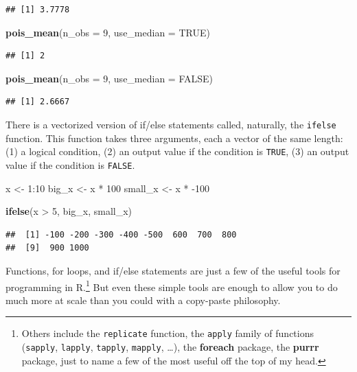 \documentclass[12pt,oneside,openany]{tufte-book}
\newenvironment{Shaded}{}{}
\newcommand{\KeywordTok}[1]{\textcolor[rgb]{0.00,0.44,0.13}{\textbf{{#1}}}}
\newcommand{\DataTypeTok}[1]{\textcolor[rgb]{0.56,0.13,0.00}{{#1}}}
\newcommand{\DecValTok}[1]{\textcolor[rgb]{0.25,0.63,0.44}{{#1}}}
\newcommand{\StringTok}[1]{\textcolor[rgb]{0.25,0.44,0.63}{{#1}}}
\newcommand{\OtherTok}[1]{\textcolor[rgb]{0.00,0.44,0.13}{{#1}}}
\newcommand{\NormalTok}[1]{{#1}}
\begin{document}
\begin{verbatim}
## [1] 3.7778
\end{verbatim}

\begin{Shaded}
\begin{Highlighting}[]
\KeywordTok{pois_mean}\NormalTok{(}\DataTypeTok{n_obs =} \DecValTok{9}\NormalTok{, }\DataTypeTok{use_median =} \OtherTok{TRUE}\NormalTok{)}
\end{Highlighting}
\end{Shaded}

\begin{verbatim}
## [1] 2
\end{verbatim}

\begin{Shaded}
\begin{Highlighting}[]
\KeywordTok{pois_mean}\NormalTok{(}\DataTypeTok{n_obs =} \DecValTok{9}\NormalTok{, }\DataTypeTok{use_median =} \OtherTok{FALSE}\NormalTok{)}
\end{Highlighting}
\end{Shaded}

\begin{verbatim}
## [1] 2.6667
\end{verbatim}

There is a vectorized version of if/else statements called, naturally,
the \texttt{ifelse} function. This function takes three arguments, each
a vector of the same length: (1) a logical condition, (2) an output
value if the condition is \texttt{TRUE}, (3) an output value if the
condition is \texttt{FALSE}.

\begin{Shaded}
\begin{Highlighting}[]
\NormalTok{x <-}\StringTok{ }\DecValTok{1}\NormalTok{:}\DecValTok{10}
\NormalTok{big_x <-}\StringTok{ }\NormalTok{x *}\StringTok{ }\DecValTok{100}
\NormalTok{small_x <-}\StringTok{ }\NormalTok{x *}\StringTok{ }\NormalTok{-}\DecValTok{100}

\KeywordTok{ifelse}\NormalTok{(x >}\StringTok{ }\DecValTok{5}\NormalTok{, big_x, small_x)}
\end{Highlighting}
\end{Shaded}

\begin{verbatim}
##  [1] -100 -200 -300 -400 -500  600  700  800
##  [9]  900 1000
\end{verbatim}

Functions, for loops, and if/else statements are just a few of the
useful tools for programming in R.\footnote{Others include the
  \texttt{replicate} function, the \texttt{apply} family of functions
  (\texttt{sapply}, \texttt{lapply}, \texttt{tapply}, \texttt{mapply},
  \ldots{}), the \textbf{foreach} package, the \textbf{purrr} package,
  just to name a few of the most useful off the top of my head.} But
even these simple tools are enough to allow you to do much more at scale
than you could with a copy-paste philosophy.
\end{document}
